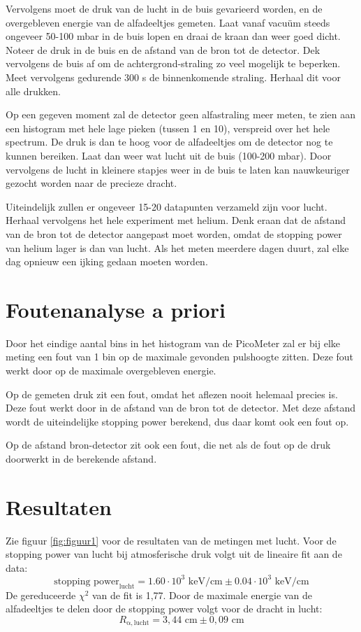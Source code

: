 \documentclass[11pt,a4paper]{article}
\begin{document}
Vervolgens moet de druk van de lucht in de buis gevarieerd worden, en de overgebleven energie van de alfadeeltjes gemeten. Laat vanaf vacuüm steeds ongeveer 50-100 mbar in de buis lopen en draai de kraan dan weer goed dicht. Noteer de druk in de buis en de afstand van de bron tot de detector. Dek vervolgens de buis af om de achtergrond-straling zo veel mogelijk te beperken. Meet vervolgens gedurende 300 s de binnenkomende straling. Herhaal dit voor alle drukken.\par
Op een gegeven moment zal de detector geen alfastraling meer meten, te zien aan een histogram met hele lage pieken (tussen 1 en 10), verspreid over het hele spectrum. De druk is dan te hoog voor de alfadeeltjes om de detector nog te kunnen bereiken. Laat dan weer wat lucht uit de buis (100-200 mbar). Door vervolgens de lucht in kleinere stapjes weer in de buis te laten kan nauwkeuriger gezocht worden naar de precieze dracht. \par
Uiteindelijk zullen er ongeveer 15-20 datapunten verzameld zijn voor lucht. Herhaal vervolgens het hele experiment met helium. Denk eraan dat de afstand van de bron tot de detector aangepast moet worden, omdat de stopping power van helium lager is dan van lucht. Als het meten meerdere dagen duurt, zal elke dag opnieuw een ijking gedaan moeten worden.

\section{Foutenanalyse a priori}
Door het eindige aantal bins in het histogram van de PicoMeter zal er bij elke meting een fout van 1 bin op de maximale gevonden pulshoogte zitten. Deze fout werkt door op de maximale overgebleven energie.\par
Op de gemeten druk zit een fout, omdat het aflezen nooit helemaal precies is. Deze fout werkt door in de afstand van de bron tot de detector. Met deze afstand wordt de uiteindelijke stopping power berekend, dus daar komt ook een fout op. \par
Op de afstand bron-detector zit ook een fout, die net als de fout op de druk doorwerkt in de berekende afstand.




\newpage

\section*{Resultaten}
Zie figuur \ref{fig:figuur1} voor de resultaten van de metingen met lucht.
Voor de stopping power van lucht bij atmosferische druk volgt uit de lineaire fit aan de data:
\begin{equation}
\text{stopping power}_\mathrm{lucht} = 1.60 \cdot 10^3 \text{ keV/cm} \pm 0.04 \cdot 10^3 \text{ keV/cm}
\label{eq:stopping_power_lucht}
\end{equation}
De gereduceerde $\chi^2$ van de fit is 1,77. Door de maximale energie van de alfadeeltjes te delen door de stopping power volgt voor de dracht in lucht:
\begin{equation}
R_\mathrm{\alpha, lucht} = 3,44 \text{ cm} \pm 0,09 \text{ cm}
\label{eq:range_air}
\end{equation}
\end{document}
